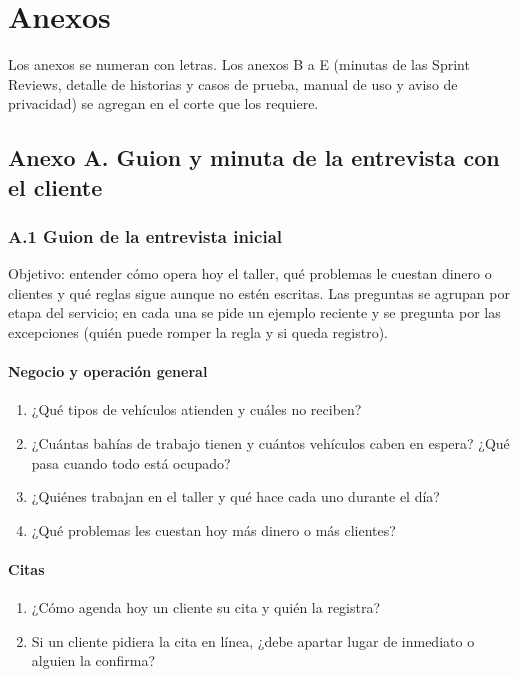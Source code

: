 \section{Anexos}\label{anexos}

Los anexos se numeran con letras. Los anexos B a E (minutas de las Sprint
Reviews, detalle de historias y casos de prueba, manual de uso y aviso de
privacidad) se agregan en el corte que los requiere.

\subsection{Anexo A. Guion y minuta de la entrevista con el cliente}\label{anexo-a}

\subsubsection{A.1 Guion de la entrevista inicial}\label{anexo-a1}

Objetivo: entender cómo opera hoy el taller, qué problemas le cuestan
dinero o clientes y qué reglas sigue aunque no estén escritas. Las
preguntas se agrupan por etapa del servicio; en cada una se pide un
ejemplo reciente y se pregunta por las excepciones (quién puede romper la
regla y si queda registro).

\paragraph{Negocio y operación general}
\begin{enumerate}
\tightlist
\item ¿Qué tipos de vehículos atienden y cuáles no reciben?
\item ¿Cuántas bahías de trabajo tienen y cuántos vehículos caben en
espera? ¿Qué pasa cuando todo está ocupado?
\item ¿Quiénes trabajan en el taller y qué hace cada uno durante el día?
\item ¿Qué problemas les cuestan hoy más dinero o más clientes?
\end{enumerate}

\paragraph{Citas}
\begin{enumerate}
\tightlist
\setcounter{enumi}{4}
\item ¿Cómo agenda hoy un cliente su cita y quién la registra?
\item Si un cliente pidiera la cita en línea, ¿debe apartar lugar de
inmediato o alguien la confirma?
\end{enumerate}

